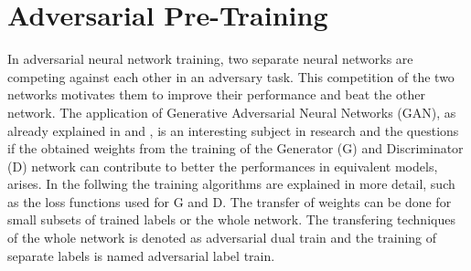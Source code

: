 
\section{Adversarial Pre-Training}\label{sec:nn_adv}
\thesisStateNotReady
In adversarial neural network training, two separate neural networks are competing against each other in an adversary task.
This competition of the two networks motivates them to improve their performance and beat the other network.
The application of Generative Adversarial Neural Networks (GAN), as already explained in  and , is an interesting subject in research and the questions if the obtained weights from the training of the Generator (G) and Discriminator (D) network can contribute to better the performances in equivalent models, arises.
In the follwing the training algorithms are explained in more detail, such as the loss functions used for G and D.
The transfer of weights can be done for small subsets of trained labels or the whole network.
The transfering techniques of the whole network is denoted as adversarial dual train and the training of separate labels is named adversarial label train.



